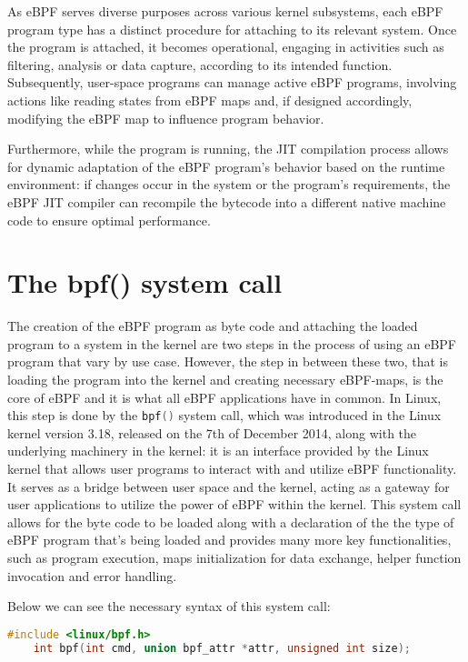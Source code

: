 As eBPF serves diverse purposes across various kernel subsystems, each eBPF program type has a distinct procedure for attaching to its relevant system. 
Once the program is attached, it becomes operational, engaging in activities such as filtering, analysis or data capture, according to its intended function. 
Subsequently, user-space programs can manage active eBPF programs, involving actions like reading states from eBPF maps and, if designed accordingly, modifying the eBPF map to influence program behavior.

Furthermore, while the program is running, the JIT compilation process allows for dynamic adaptation of the eBPF program's behavior based on the runtime environment: if changes occur in the system or the program's requirements, the eBPF JIT compiler can recompile the bytecode into a different native machine code to ensure optimal performance.

\section{The bpf() system call}

The creation of the eBPF program as byte code and attaching the loaded program to a system in the kernel are two steps in the process of using an eBPF program that vary by use case.
However, the step in between these two, that is loading the program into the kernel and creating necessary eBPF-maps, is the core of eBPF and it is what all eBPF applications have in common.
In Linux, this step is done by the \colorbox{backcolour}{\lstinline[style=cstyle, language=C]|bpf()|} system call, which was introduced in the Linux kernel version 3.18, released on the 7th of December 2014, along with the underlying machinery in the kernel: it is an interface provided by the Linux kernel that allows user programs to interact with and utilize eBPF functionality. 
It serves as a bridge between user space and the kernel, acting as a gateway for user applications to utilize the power of eBPF within the kernel.
This system call allows for the byte code to be loaded along with a declaration of the the type of eBPF program that’s being loaded and provides many more key functionalities, such as program execution, maps initialization for data exchange, helper function invocation and error handling.

Below we can see the necessary syntax of this system call:

\begin{lstlisting}[style=cstyle, language=C, caption={bpf() system call signature}]
	#include <linux/bpf.h>
	int bpf(int cmd, union bpf_attr *attr, unsigned int size);
\end{lstlisting}

